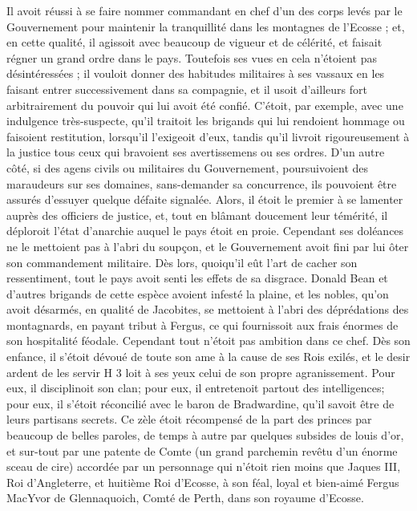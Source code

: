 Il avoit réussi à se faire nommer commandant en chef d'un des corps levés par le Gouvernement pour maintenir la tranquillité dans les montagnes de l'Ecosse ; et, en cette qualité, il agissoit avec beaucoup de vigueur et de célérité, et faisait régner un grand ordre dans le pays. Toutefois ses vues en cela n'étoient pas désintéressées ; il vouloit donner des habitudes militaires à ses vassaux en les faisant entrer successivement dans sa compagnie, et il usoit d'ailleurs fort arbitrairement du pouvoir qui lui avoit été confié. C'étoit, par exemple, avec une indulgence très-suspecte, qu'il traitoit les brigands qui lui rendoient hommage ou faisoient restitution, lorsqu'il l'exigeoit d'eux, tandis qu'il\setcounter{page}{117} livroit rigoureusement à la justice tous ceux qui bravoient ses avertissemens ou ses ordres. D'un autre côté, si des agens civils ou militaires du Gouvernement, poursuivoient des maraudeurs sur ses domaines, sans-demander sa concurrence, ils pouvoient être assurés d'essuyer quelque défaite signalée. Alors, il étoit le premier à se lamenter auprès des officiers de justice, et, tout en blâmant doucement leur témérité, il déploroit l'état d'anarchie auquel le pays étoit en proie.
Cependant ses doléances ne le mettoient pas à l'abri du soupçon, et le Gouvernement avoit fini par lui ôter son commandement militaire. Dès lors, quoiqu'il eût l'art de cacher son ressentiment, tout le pays avoit senti les effets de sa disgrace. Donald Bean et d'autres brigands de cette espèce avoient infesté la plaine, et les nobles, qu'on avoit désarmés, en qualité de Jacobites, se mettoient à l'abri des déprédations des montagnards, en payant tribut à Fergus, ce qui fournissoit aux frais énormes de son hospitalité féodale.
Cependant tout n'étoit pas ambition dans ce chef. Dès son enfance, il s'étoit dévoué de toute son ame à la cause de ses Rois exilés, et le desir ardent de les servir
H 3\setcounter{page}{118} loit à ses yeux celui de son propre agranissement. Pour eux, il disciplinoit son clan; pour eux, il entretenoit partout des intelligences; pour eux, il s'étoit réconcilié avec le baron de Bradwardine, qu'il savoit être de leurs partisans secrets. Ce zèle étoit récompensé de la part des princes par beaucoup de belles paroles, de temps à autre par quelques subsides de louis d'or, et sur-tout par une patente de Comte (un grand parchemin revêtu d'un énorme sceau de cire) accordée par un personnage qui n'étoit rien moins que Jaques III, Roi d'Angleterre, et huitième Roi d'Ecosse, à son féal, loyal et bien-aimé Fergus MacYvor de Glennaquoich, Comté de Perth, dans son royaume d'Ecosse.
